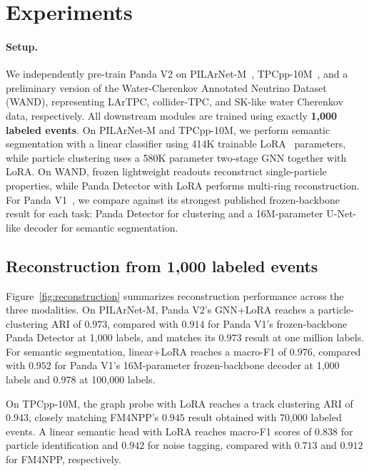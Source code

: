 \section{Experiments}
\label{sec:experiments}

\paragraph{Setup.}
We independently pre-train Panda V2 on PILArNet-M~\citep{polarmae}, TPCpp-10M~\citep{tpcpp10m}, and a preliminary version of the Water-Cherenkov Annotated Neutrino Dataset (WAND), representing LArTPC, collider-TPC, and SK-like water Cherenkov data, respectively. All downstream modules are trained using exactly \textbf{1,000 labeled events}. On PILArNet-M and TPCpp-10M, we perform semantic segmentation with a linear classifier using 414K trainable LoRA~\citep{lora} parameters, while particle clustering uses a 580K parameter two-stage GNN together with LoRA. On WAND, frozen lightweight readouts reconstruct single-particle properties, while Panda Detector with LoRA performs multi-ring reconstruction. For Panda V1~\citep{panda}, we compare against its strongest published frozen-backbone result for each task: Panda Detector for clustering and a 16M-parameter U-Net-like decoder for semantic segmentation.

\subsection{Reconstruction from 1,000 labeled events}
\label{sec:reconstruction_results}

Figure~\ref{fig:reconstruction} summarizes reconstruction performance across the three modalities. On PILArNet-M, Panda V2's GNN+LoRA reaches a particle-clustering ARI of $0.973$, compared with $0.914$ for Panda V1's frozen-backbone Panda Detector at 1,000 labels, and matches its $0.973$ result at one million labels. For semantic segmentation, linear+LoRA reaches a macro-F1 of $0.976$, compared with $0.952$ for Panda V1's 16M-parameter frozen-backbone decoder at 1,000 labels and $0.978$ at 100,000 labels.

On TPCpp-10M, the graph probe with LoRA reaches a track clustering ARI of $0.943$, closely matching FM4NPP's $0.945$ result obtained with 70,000 labeled events. A linear semantic head with LoRA reaches macro-F1 scores of $0.838$ for particle identification and $0.942$ for noise tagging, compared with $0.713$ and $0.912$ for FM4NPP, respectively.

